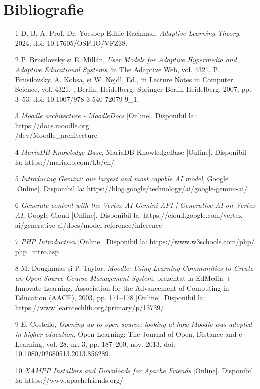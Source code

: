 \chapter*{Bibliografie} 

\begin{itemize}
    \item [1] D. B. A. Prof. Dr. Yoesoep Edhie Rachmad, \textit{Adaptive Learning Theory}, 2024, doi: 10.17605/OSF.IO/VFZ38.
    \item [2] P. Brusilovsky și E. Millán, \textit{User Models for Adaptive Hypermedia and Adaptive Educational Systems}, în The Adaptive Web, vol. 4321, P. Brusilovsky, A. Kobsa, și W. Nejdl, Ed., în Lecture Notes in Computer Science, vol. 4321. , Berlin, Heidelberg: Springer Berlin Heidelberg, 2007, pp. 3–53. doi: 10.1007/978-3-540-72079-9\_1.
    \item [3] \textit{Moodle architecture - MoodleDocs} [Online]. Disponibil la: https://docs.moodle.org\\/dev/Moodle\_architecture
    \item [4] \textit{MariaDB Knowledge Base}, MariaDB KnowledgeBase [Online]. Disponibil la: https://mariadb.com/kb/en/
    \item [5] \textit{Introducing Gemini: our largest and most capable AI model}, Google [Online]. Disponibil la: https://blog.google/technology/ai/google-gemini-ai/
    \item [6] \textit{Generate content with the Vertex AI Gemini API | Generative AI on Vertex AI}, Google Cloud [Online]. Disponibil la: https://cloud.google.com/vertex-ai/generative-ai/docs/model-reference/inference
    \item [7] \textit{PHP Introduction} [Online]. Disponibil la: https://www.w3schools.com/php/\\php\_intro.asp
    \item [8] M. Dougiamas și P. Taylor, \textit{Moodle: Using Learning Communities to Create an Open Source Course Management System}, prezentat la EdMedia + Innovate Learning, Association for the Advancement of Computing in Education (AACE), 2003, pp. 171–178 [Online]. Disponibil la: https://www.learntechlib.org/primary/p/13739/
    \item [9] E. Costello, \textit{Opening up to open source: looking at how Moodle was adopted in higher education}, Open Learning: The Journal of Open, Distance and e-Learning, vol. 28, nr. 3, pp. 187–200, nov. 2013, doi: 10.1080/02680513.2013.856289.
    \item [10] \textit{XAMPP Installers and Downloads for Apache Friends} [Online]. Disponibil la: https://www.apachefriends.org/

\end{itemize}
